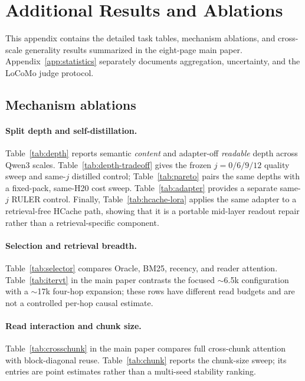 \section{Additional Results and Ablations}
\label{sec:appendix}

This appendix contains the detailed task tables, mechanism ablations, and
cross-scale generality results summarized in the eight-page main paper.
Appendix~\ref{app:statistics} separately documents aggregation, uncertainty,
and the LoCoMo judge protocol.

\subsection{Mechanism ablations}
\label{app:ablations}

\paragraph{Split depth and self-distillation.}
Table~\ref{tab:depth} reports semantic \emph{content} and adapter-off
\emph{readable} depth across Qwen3 scales. Table~\ref{tab:depth-tradeoff} gives
the frozen $j=0/6/9/12$ quality sweep and same-$j$ distilled control;
Table~\ref{tab:pareto} pairs the same depths with a fixed-pack, same-H20 cost
sweep. Table~\ref{tab:adapter} provides a separate same-$j$ RULER control.
Finally, Table~\ref{tab:hcache-lora} applies the same adapter to a retrieval-free
HCache path, showing that it is a portable mid-layer readout repair rather than
a retrieval-specific component.







\paragraph{Selection and retrieval breadth.}
Table~\ref{tab:selector} compares Oracle, BM25, recency, and reader attention.
Table~\ref{tab:itervt} in the main paper contrasts the focused $\sim$6.5k
configuration with a $\sim$17k four-hop expansion; these rows have different
read budgets and are not a controlled per-hop causal estimate.




\paragraph{Read interaction and chunk size.}
Table~\ref{tab:crosschunk} in the main paper compares full cross-chunk attention
with block-diagonal reuse. Table~\ref{tab:chunk} reports the chunk-size sweep;
its entries are point estimates rather than a multi-seed stability ranking.

